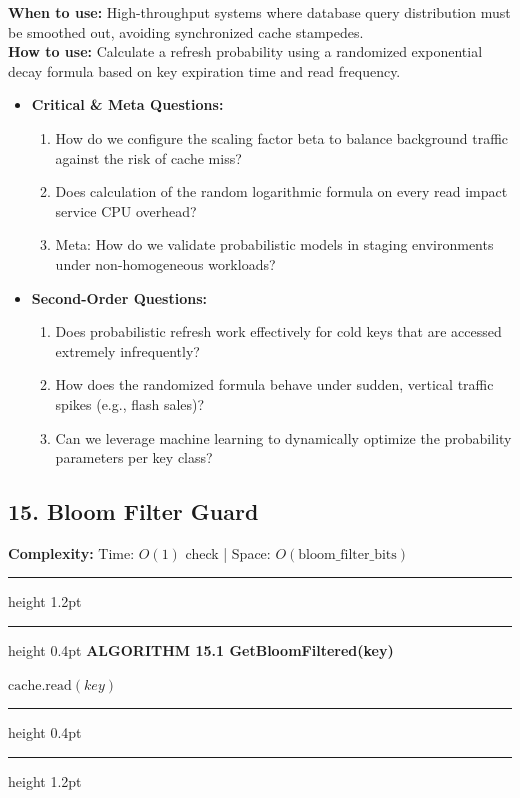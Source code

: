 \documentclass[11pt,a4paper]{article}
\newenvironment{textbookalgo}[2]{%
  \par\addvspace{1.2em}\noindent
  \hrule height 1.2pt
  \vspace{1.5pt}
  \hrule height 0.4pt
  \vspace{5pt}
  {\noindent\large\bfseries\sffamily ALGORITHM #1 \quad #2}
  \par\vspace{5pt}
  \RestyleAlgo{plain}
}{%
  \par\vspace{4pt}
  \hrule height 0.4pt
  \vspace{1.5pt}
  \hrule height 1.2pt
  \par\addvspace{1.2em}
}
\theoremstyle{definition}
\begin{document}
\noindent
\textbf{When to use:} High-throughput systems where database query distribution must be smoothed out, avoiding synchronized cache stampedes.\\
\textbf{How to use:} Calculate a refresh probability using a randomized exponential decay formula based on key expiration time and read frequency.
\begin{itemize}[leftmargin=*]
  \item[] \textbf{Critical \& Meta Questions:}
  \begin{enumerate}
  \item How do we configure the scaling factor beta to balance background traffic against the risk of cache miss?
  \item Does calculation of the random logarithmic formula on every read impact service CPU overhead?
  \item Meta: How do we validate probabilistic models in staging environments under non-homogeneous workloads?
  \end{enumerate}
  \item[] \textbf{Second-Order Questions:}
  \begin{enumerate}
  \item Does probabilistic refresh work effectively for cold keys that are accessed extremely infrequently?
  \item How does the randomized formula behave under sudden, vertical traffic spikes (e.g., flash sales)?
  \item Can we leverage machine learning to dynamically optimize the probability parameters per key class?
  \end{enumerate}
\end{itemize}
\medskip

\clearpage
\subsection{15. Bloom Filter Guard}

\noindent
\textbf{Complexity:} Time: $O(1)$ check | Space: $O(\text{bloom\_filter\_bits})$
\smallskip

\begin{textbookalgo}{15.1}{GetBloomFiltered(key)}
\begin{algorithm}[H]
\Return $\text{cache.read}(key)$\;
\end{algorithm}
\end{textbookalgo}
\end{document}
